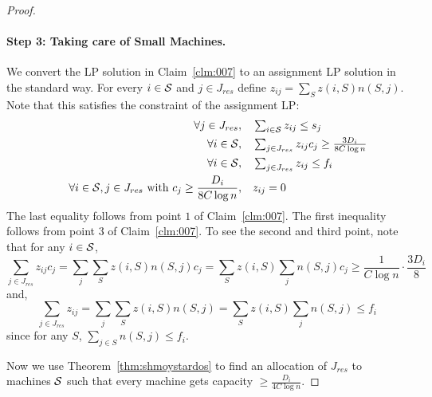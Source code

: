 \documentclass{article}[11pt]
\begin{document}
\begin{proof}
\begin{claim}
\begin{enumerate} [noitemsep]
\end{enumerate}
\end{claim}
\paragraph{Step 3: Taking care of Small Machines.} We convert the LP solution in Claim~\ref{clm:007} to an assignment LP solution in the standard way.
For every $i\in {\cal S}$ and $j\in J_{res}$ define $z_{ij} = \sum_{S} z(i,S)n(S,j)$. Note that this satisfies the constraint of the assignment LP:
	\begin{alignat}{4}
		&& \quad \forall j \in J_{res},   &\quad  \textstyle \sum_{i\in {\cal S}} z_{ij}  \leq  s_j \notag  \\
		&& \quad \forall i\in {\cal S} ,      &\quad  \textstyle \sum_{j\in J_{res}}  z_{ij}c_j \geq \frac{3D_i}{8C\log n} \notag\\
	&& \quad \forall i\in {\cal S} ,      &\quad  \textstyle \sum_{j\in J_{res}}  z_{ij} \leq f_i \notag\\ 
		&& \quad \forall i\in {\cal S}, j\in J_{res} ~\textrm{with}~ c_j \geq \frac{D_i}{8C\log n}, & \quad z_{ij}   =  0   \notag
	\end{alignat}
	The last equality follows from point $1$ of Claim~\ref{clm:007}.
The first inequality follows from point 3 of Claim~\ref{clm:007}. To see the second and third point, note 
that for any $i\in {\cal S}$,
\[
\sum_{j\in J_{res}} z_{ij}c_j = \sum_j \sum_S z(i,S)n(S,j)c_j = \sum_S z(i,S) \sum_j n(S,j)c_j \geq \frac{1}{C\log n}\cdot \frac{3D_i}{8}
\]
	and,
\[
\sum_{j\in J_{res}} z_{ij} = \sum_j \sum_S z(i,S)n(S,j) = \sum_S z(i,S) \sum_j n(S,j) \leq f_i
\]
since for any $S$, $\sum_{j\in S} n(S,j) \leq f_i$. \smallskip

Now we use Theorem~\ref{thm:shmoystardos} to find an allocation of $J_{res}$ to machines ${\cal S}$ such that every machine gets capacity $\geq \frac{D_i}{4C\log n}$.

\end{proof}
\end{document}
